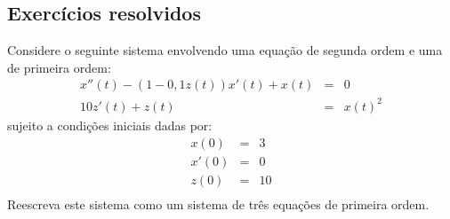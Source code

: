 \subsection*{Exercícios resolvidos}
\begin{exeresol} Considere o seguinte sistema envolvendo uma equação de segunda ordem e uma de primeira ordem:
\begin{eqnarray}
x''(t)-(1- 0,1 z(t))x'(t)+ x(t)&=&0\\
10 z'(t)+z(t)&=&x(t)^2
\end{eqnarray}
sujeito a condições iniciais dadas por:
\begin{eqnarray}
x(0)&=&3\\
x'(0)&=&0\\
z(0)&=&10\\
\end{eqnarray}
Reescreva este sistema como um sistema de três equações de primeira ordem.
\end{exeresol}
